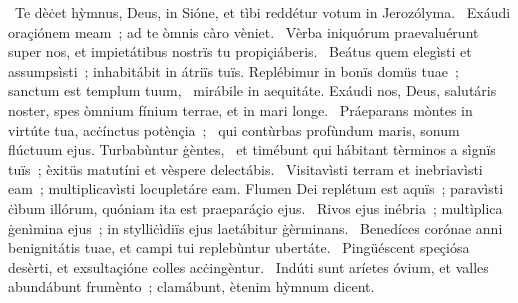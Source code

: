 ~Te dèċet hỳmnus, Deus, in Sióne, et tìbi reddétur votum in Jerozólyma. 
~Exáudi oraçiónem meam~; ad te òmnis càro vèniet. 
~Vèrba iniquórum praevaluérunt super nos, et impietátibus nostrïs tu propiçiáberis. 
~Beátus quem elegìsti et assumpsìsti~; inhabitábit in átriïs tuïs. Replébimur in bonïs domüs tuae~; sanctum est templum tuum, 
~mirábile in aequitáte. Exáudi nos, Deus, salutáris noster, spes òmnium fínium terrae, et in mari longe. 
~Práeparans mòntes in virtúte tua, acċínctus potènçia~; 
~qui contùrbas profùndum maris, sonum flúctuum ejus. Turbabùntur ġèntes, 
~et timébunt qui hábitant tèrminos a sìgnïs tuïs~; èxitüs matutíni et vèspere delectábis. 
~Visitavìsti terram et inebriavìsti eam~; multiplicavìsti locupletáre eam. Flumen Dei replétum est aquïs~; paravìsti ċìbum illórum, quóniam ita est praeparáçio ejus. 
~Rivos ejus inébria~; multìplica ġenìmina ejus~; in stylliċìdiïs ejus laetábitur ġèrminans. 
~Benedíces corónae anni benignitátis tuae, et campi tui replebùntur ubertáte. 
~Pingüéscent speçiósa desèrti, et exsultaçióne colles acċingèntur. 
~Indúti sunt aríetes óvium, et valles abundábunt frumènto~; clamábunt, ètenim hỳmnum dicent. 
